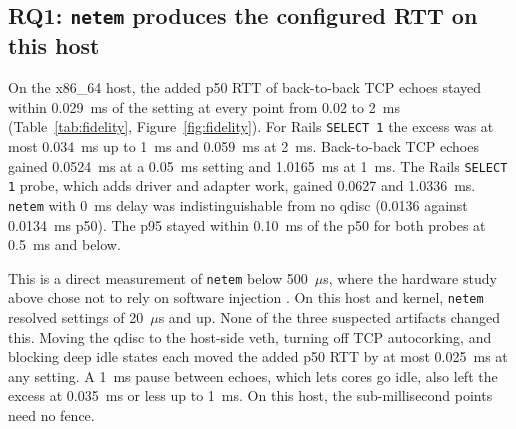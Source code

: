 \documentclass[11pt]{article}
\begin{document}
\subsection{RQ1: \texttt{netem} produces the configured RTT on this host}

On the x86\_64 host, the added p50 RTT of back-to-back TCP echoes stayed within 0.029~ms of the
setting at every point from 0.02 to 2~ms (Table~\ref{tab:fidelity}, Figure~\ref{fig:fidelity}).
For Rails \texttt{SELECT 1} the excess was at most 0.034~ms up to 1~ms and 0.059~ms at 2~ms. Back-to-back TCP echoes
gained 0.0524~ms at a 0.05~ms setting and 1.0165~ms at 1~ms. The Rails \texttt{SELECT 1}
probe, which adds driver and adapter work, gained 0.0627 and 1.0336~ms. \texttt{netem} with
0~ms delay was indistinguishable from no qdisc (0.0136 against 0.0134~ms p50). The p95 stayed
within 0.10~ms of the p50 for both probes at 0.5~ms and below.

This is a direct measurement of \texttt{netem} below 500~$\mu$s, where the hardware study
above chose not to rely on software injection \citep{popescu2017latency}. On this host and
kernel, \texttt{netem} resolved settings of 20~$\mu$s and up. None of the three suspected
artifacts changed this. Moving the qdisc to the host-side veth,
turning off TCP autocorking, and blocking deep idle states each moved the added p50 RTT by at
most 0.025~ms at any setting. A 1~ms pause between echoes, which lets cores go idle, also left
the excess at 0.035~ms or less up to 1~ms. On this host, the sub-millisecond points need no
fence.
\end{document}
